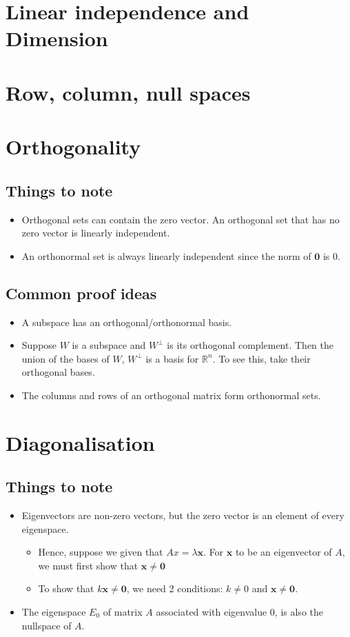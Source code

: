 \documentclass{article}
\begin{document}
\section{Linear independence and Dimension}

\section{Row, column, null spaces}

\section{Orthogonality}
\subsection{Things to note}
\begin{itemize}
	\item Orthogonal sets can contain the zero vector. An orthogonal set that has no zero vector is linearly independent.
	\item An orthonormal set is always linearly independent since the norm of $\mathbf{0}$ is $0$.
\end{itemize}

\subsection{Common proof ideas}
\begin{itemize}
	\item A subspace has an orthogonal/orthonormal basis.
	\item Suppose $W$ is a subspace and $W^{\perp}$ is its orthogonal complement. Then the union of the bases of $W$, $W^\perp$ is a basis for $\mathbb{R}^n$. To see this, take their orthogonal bases.
	\item The columns and rows of an orthogonal matrix form orthonormal sets.
\end{itemize}

\section{Diagonalisation}
\subsection{Things to note}
\begin{itemize}
	\item Eigenvectors are non-zero vectors, but the zero vector is an element of every eigenspace.
	\begin{itemize}
		\item Hence, suppose we given that $Ax=\lambda \mathbf{x}$. For $\mathbf{x}$ to be an eigenvector of $A$, we must first show that $\mathbf{x}\neq \mathbf{0}$
		\item To show that $k\mathbf{x}\neq \mathbf{0}$, we need 2 conditions: $k\neq 0$ and $\mathbf{x}\neq \mathbf{0}$.
	\end{itemize}
	\item The eigenspace $E_0$ of matrix $A$ associated with eigenvalue $0$, is also the nullspace of $A$.
\end{itemize}
\end{document}
